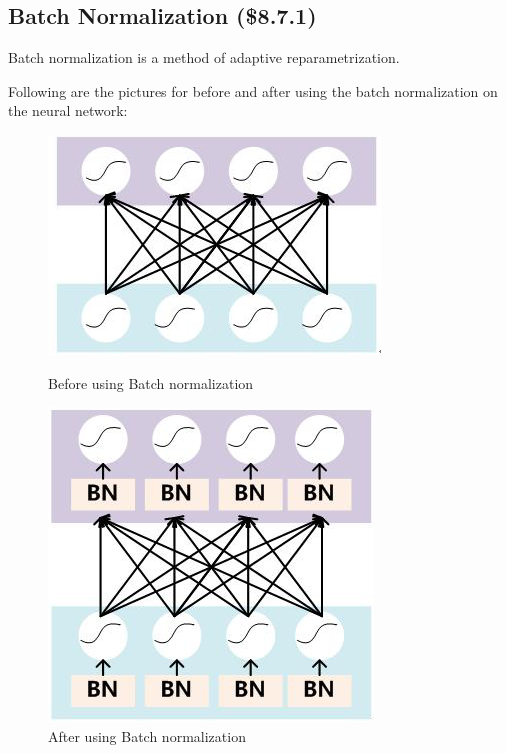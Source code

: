 \documentclass[12pt]{article}
\numberwithin{equation}{section}
\begin{document}
\subsection{Batch Normalization (\$8.7.1)}
	Batch normalization is a method of adaptive reparametrization. \par
	Following are the pictures for before and after using the batch normalization on the neural network:
	\begin{figure}[!htb]
   		\begin{minipage}{0.48\textwidth}
   		 	\centering
     			\includegraphics[width=.7\linewidth]{fig_DL/batchnormalization1.png}
     			\caption{Before using Batch normalization}\label{Fig:batchnormalization1}
  		 \end{minipage}\hfill
   		\begin {minipage}{0.48\textwidth}
     			\centering
     			\includegraphics[width=.7\linewidth]{fig_DL/batchnormalization2.png}
     			\caption{After using Batch normalization}\label{Fig:batchnormalization2}
   		\end{minipage}
	\end{figure} \par
\end{document}
